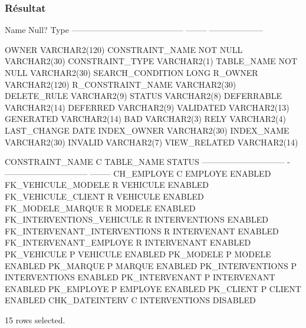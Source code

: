 \documentclass[•]{article}
\begin{document}
\subsubsection{Résultat}
\begin{sql}
  Name                                      Null?    Type
 ----------------------------------------- -------- --------------------

 OWNER                                              VARCHAR2(120)
 CONSTRAINT_NAME                           NOT NULL VARCHAR2(30)
 CONSTRAINT_TYPE                                    VARCHAR2(1)
 TABLE_NAME                                NOT NULL VARCHAR2(30)
 SEARCH_CONDITION                                   LONG
 R_OWNER                                            VARCHAR2(120)
 R_CONSTRAINT_NAME                                  VARCHAR2(30)
 DELETE_RULE                                        VARCHAR2(9)
 STATUS                                             VARCHAR2(8)
 DEFERRABLE                                         VARCHAR2(14)
 DEFERRED                                           VARCHAR2(9)
 VALIDATED                                          VARCHAR2(13)
 GENERATED                                          VARCHAR2(14)
 BAD                                                VARCHAR2(3)
 RELY                                               VARCHAR2(4)
 LAST_CHANGE                                        DATE
 INDEX_OWNER                                        VARCHAR2(30)
 INDEX_NAME                                         VARCHAR2(30)
 INVALID                                            VARCHAR2(7)
 VIEW_RELATED                                       VARCHAR2(14)

CONSTRAINT_NAME                C TABLE_NAME                     STATUS
------------------------------ - ------------------------------ --------
CH_EMPLOYE                     C EMPLOYE                        ENABLED
FK_VEHICULE_MODELE             R VEHICULE                       ENABLED
FK_VEHICULE_CLIENT             R VEHICULE                       ENABLED
FK_MODELE_MARQUE               R MODELE                         ENABLED
FK_INTERVENTIONS_VEHICULE      R INTERVENTIONS                  ENABLED
FK_INTERVENANT_INTERVENTIONS   R INTERVENANT                    ENABLED
FK_INTERVENANT_EMPLOYE         R INTERVENANT                    ENABLED
PK_VEHICULE                    P VEHICULE                       ENABLED
PK_MODELE                      P MODELE                         ENABLED
PK_MARQUE                      P MARQUE                         ENABLED
PK_INTERVENTIONS               P INTERVENTIONS                  ENABLED
PK_INTERVENANT                 P INTERVENANT                    ENABLED
PK_EMPLOYE                     P EMPLOYE                        ENABLED
PK_CLIENT                      P CLIENT                         ENABLED
CHK_DATEINTERV                 C INTERVENTIONS                  DISABLED

15 rows selected.
\end{sql}
\end{document}
